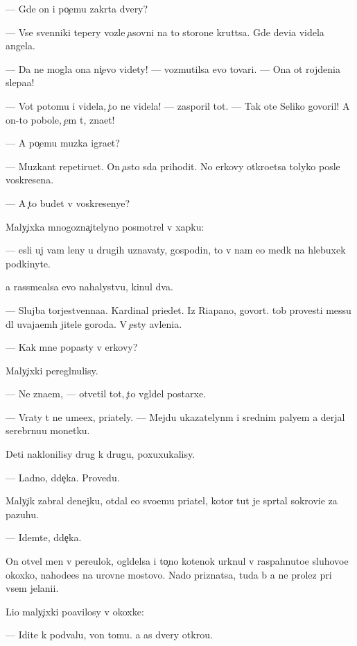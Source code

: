 \documentclass[10pt]{book}
\begin{document}
— Gde on i po{\c}emu zakr{\yi}ta dvery?

— Vse sv{\ia}{\x}enniki tepery vozle {\c}asovni na to{\y} storone krut{\ia}tsa. Gde devi{\q}a videla angela.

— Da ne mogla ona ni{\c}evo videty! — vozmutilsa {\y}evo tovari{\x}. — Ona ot rojdeni{\y}a slepa{\y}a!

— Vot potomu i videla, {\c}to ne videla! — zasporil tot. — Tak ote{\q} Seliko govoril! A on-to pobole, {\c}em t{\yi}, zna{\y}et!

— A po{\c}emu muz{\yi}ka igra{\y}et?

— Muz{\yi}kant repetiru{\y}et. On {\c}asto s{\iu}da prihodit. No {\q}erkovy otkro{\y}etsa tolyko posle voskresen{\y}a.

— A {\c}to budet v voskresenye?

Maly{\c}ixka mnogozna{\c}itelyno posmotrel v xapku:

— {\Y}esli uj vam leny u drugih uznavaty, gospodin, to v{\yi} nam {\y}e{\x}o med{\ia}k na hlebuxek podkinyte.

{\Y}a rassme{\y}alsa {\y}evo nahalystvu, kinul dva.

— Slujba torjestvenna{\y}a. Kardinal pri{\y}edet. Iz Riapano, govor{\ia}t. {\C}tob{\yi} provesti messu dl{\ia} uvaja{\y}em{\yi}h jitele{\y} goroda. V {\c}esty {\y}avleni{\y}a.

— Kak mne popasty v {\q}erkovy?

Maly{\c}ixki peregl{\ia}nulisy.

— Ne zna{\y}em, — otvetil tot, {\c}to v{\yi}gl{\ia}del postarxe.

— Vraty t{\yi} ne ume{\y}ex, pri{\y}ately. — Mejdu ukazatelyn{\yi}m i srednim paly{\q}em {\y}a derjal serebr{\ia}nu{\y}u monetku.

Deti naklonilisy drug k drugu, poxuxukalisy.

— Ladno, d{\ia}de{\c}ka. Provedu.

Maly{\c}ik zabral denejku, otdal {\y}e{\y}o svo{\y}emu pri{\y}atel{\iu}, kotor{\yi}{\y} tut je spr{\ia}tal sokrovi{\x}e za pazuhu.

— Idemte, d{\ia}de{\c}ka.

On otvel men{\ia} v pereulok, ogl{\ia}delsa i to{\c}no kotenok {\y}urknul v raspahnuto{\y}e sluhovo{\y}e okoxko, nahod{\ia}{\x}e{\y}es{\ia} na urovne mostovo{\y}. Nado priznatsa, tuda b{\yi} {\y}a ne prolez pri vsem jelani{\y}i.

Li{\q}o maly{\c}ixki po{\y}avilosy v okoxke:

— Idite k podvalu, von tomu. {\Y}a {\x}as dvery otkro{\y}u.
\end{document}
